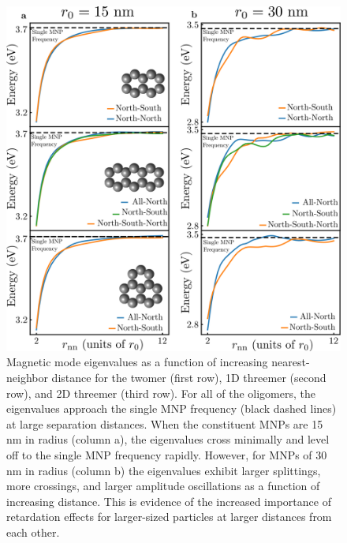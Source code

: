 \documentclass[12pt, letterpaper, twoside]{report}
\begin{document}
\begin{figure}
\centering
\includegraphics[width=6in]{spacing_study.png}
\caption{Magnetic mode eigenvalues as a function of increasing nearest-neighbor distance for the twomer (first row), 1D threemer (second row), and 2D threemer (third row). For all of the oligomers, the eigenvalues approach the single MNP frequency (black dashed lines) at large separation distances. When the constituent MNPs are 15 nm in radius (column a), the eigenvalues cross minimally and level off to the single MNP frequency rapidly. However, for MNPs of 30 nm in radius (column b) the eigenvalues exhibit larger splittings, more crossings, and larger amplitude oscillations as a function of increasing distance. This is evidence of the increased importance of retardation effects for larger-sized particles at larger distances from each other.}
\label{spacing}
\end{figure}
\end{document}
